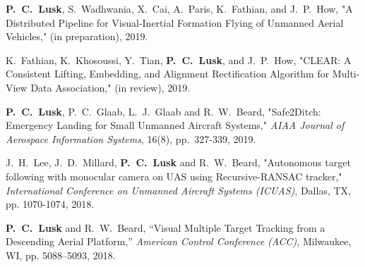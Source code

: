 

\renewcommand{\section}[2]{} %
\begin{thebibliography}{aa}

 \textbf{P.\ C.\ Lusk}, S.\ Wadhwania, X.\ Cai, A.\ Paris, K.\ Fathian, and J.\ P.\ How, "A Distributed Pipeline for Visual-Inertial Formation Flying of Unmanned Aerial Vehicles," (in preparation), 2019.

 K.\ Fathian, K.\ Khosoussi, Y.\ Tian, \textbf{P.\ C.\ Lusk}, and J.\ P.\ How, "CLEAR: A Consistent Lifting, Embedding, and Alignment Rectification Algorithm for Multi-View Data Association," (in review), 2019.

 \textbf{P.\ C.\ Lusk}, P.\ C.\ Glaab, L.\ J.\ Glaab and R.\ W.\ Beard, "Safe2Ditch: Emergency Landing for Small Unmanned Aircraft Systems," \emph{AIAA Journal of Aerospace Information Systems}, 16(8), pp.\ 327-339, 2019.

 J.\ H.\ Lee, J.\ D.\ Millard, \textbf{P.\ C.\ Lusk} and R.\ W.\ Beard, "Autonomous target following with monocular camera on UAS using Recursive-RANSAC tracker," \emph{International Conference on Unmanned Aircraft Systems (ICUAS)}, Dallas, TX, pp. 1070-1074, 2018.

 \textbf{P.\ C.\ Lusk} and R.\ W.\ Beard, “Visual Multiple Target Tracking from a Descending Aerial Platform,” \emph{American Control Conference (ACC)}, Milwaukee, WI, pp. 5088–5093, 2018.

\end{thebibliography}